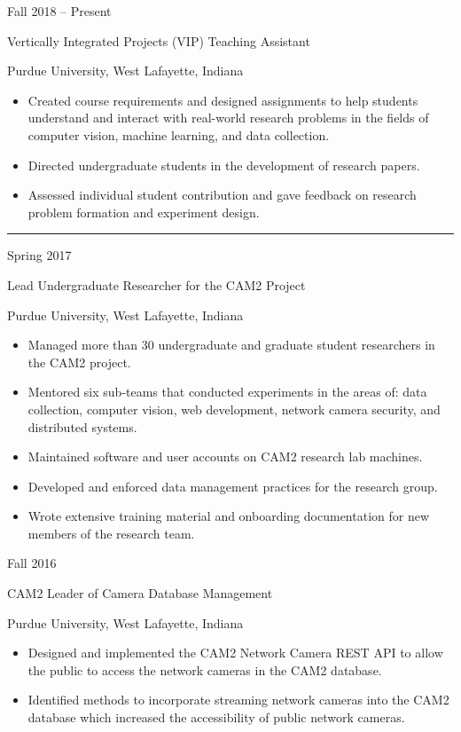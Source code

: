 \documentclass[10pt]{article}
\newlength{\cvcolumngapwidth}
\newlength{\cvleftcolumnwidth}
\newlength{\cvrightcolumnwidth}
\newcommand{\cvsectionstyle}[1]{{\normalsize\cvsectionfont\textcolor{cvsectioncolor}{#1}}}
\newcommand{\cvtitlestyle}[1]{{\large\cvtitlefont\textcolor{cvtitlecolor}{#1}}}
\newcommand{\cvdurationstyle}[1]{{\small\cvdurationfont\textcolor{cvdurationcolor}{#1}}}
\newlength{\cvafteritemskipamount}
\newlength{\cvaftersectionskipamount}
\newlength{\cvparskip}
\newcommand{\cvsection}[1]{
    \begin{minipage}[t]{\cvleftcolumnwidth}
        \raggedleft\cvsectionstyle{#1}
    \end{minipage}%
    \hspace{\cvcolumngapwidth}%
    \begin{minipage}[t]{\cvrightcolumnwidth}
        \textcolor{cvrulecolor}{\rule{\cvrightcolumnwidth}{0.3mm}}
    \end{minipage}

    \vspace{\cvaftersectionskipamount}
}
\newcommand{\cvitem}[2]{
    \begin{minipage}[t]{\cvleftcolumnwidth}
        \raggedleft #1
    \end{minipage}%
    \hspace{\cvcolumngapwidth}%
    \begin{minipage}[t]{\cvrightcolumnwidth}
        \setlength{\parskip}{\cvparskip} #2
    \end{minipage}

    \vspace{\cvafteritemskipamount}
}
\newcommand{\cvtitle}[1]{
    \cvtitlestyle{#1}

    \vspace{1mm plus 0.25mm minus 0.25mm}
    \vspace{-\cvparskip}
}
\begin{document}
\cvitem{
    \cvdurationstyle{Fall 2018 – Present}
}{
    \cvtitle{Vertically Integrated Projects (VIP) Teaching Assistant}

    Purdue University, West Lafayette, Indiana

    \begin{itemize}[leftmargin=*]
        \item Created course requirements and designed assignments to help students understand and interact with real-world research problems in the fields of computer vision, machine learning, and data collection.
        \item Directed undergraduate students in the development of research papers.
        \item Assessed individual student contribution and gave feedback on research problem formation and experiment design.
    \end{itemize}
}

\cvsection{RESEARCH EXPERIENCE}

\cvitem{
    \cvdurationstyle{Spring 2017}
}{
    \cvtitle{Lead Undergraduate Researcher for the CAM2 Project}

    Purdue University, West Lafayette, Indiana

    \begin{itemize}[leftmargin=*]
        \item Managed more than 30 undergraduate and graduate student researchers in the CAM2 project.
        \item Mentored six sub-teams that conducted experiments in the areas of: data collection, computer vision, web development, network camera security, and distributed systems.
        \item Maintained software and user accounts on CAM2 research lab machines.
        \item Developed and enforced data management practices for the research group. 
        \item Wrote extensive training material and onboarding documentation for new members of the research team.
    \end{itemize}
}

\cvitem{
    \cvdurationstyle{Fall 2016}
}{
    \cvtitle{CAM2 Leader of Camera Database Management}

    Purdue University, West Lafayette, Indiana

    \begin{itemize}[leftmargin=*]
        \item Designed and implemented the CAM2 Network Camera REST API to allow the public to access the network cameras in the CAM2 database.
        \item Identified methods to incorporate streaming network cameras into the CAM2 database which increased the accessibility of public network cameras. 
    \end{itemize}
}
\end{document}
